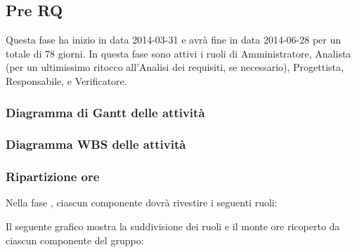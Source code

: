\subsection{Pre RQ}
Questa fase ha inizio in data 2014-03-31 e avrà fine in data 2014-06-28 per un totale di 78 giorni. In questa fase sono attivi i ruoli di Amministratore, Analista (per un ultimissimo ritocco all'Analisi dei requisiti, se necessario), Progettista, Responsabile,  e Verificatore.

\subsubsection{Diagramma di Gantt delle attività}

\newpage
\subsubsection{Diagramma WBS delle attività}

\newpage
\subsubsection{Ripartizione ore}

\newpage
Nella fase , ciascun componente dovrà rivestire i seguenti ruoli:

Il seguente grafico mostra la suddivisione dei ruoli e il monte ore ricoperto da ciascun componente del gruppo:
